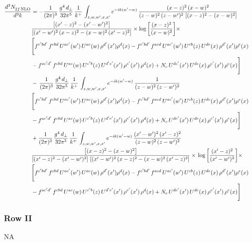 \documentclass[9pt]{article}
\numberwithin{equation}{section}
\begin{document}
\begin{align}
    \frac{d^{3}N_{2f\,\rm NLO}^{\rm}}{d^{3}k}  & =   - \frac{1}{(2\pi)^{3}}\, \frac{g^{4}\,d_{\perp}}{32\pi^{5}}\,\frac{1}{k^{+}}\,\int_{z,w,w^{\prime},x,x'} e^{-ik(w^{\prime}-w)}\,\frac{(x-z)^{2}\, (x-w)^{2}}{(z-w)^{2}\, (z-w')^{2}\,\left[(x-z)^{2} - (x-w)^{2}\right]}\notag \\ & \frac{\left[(x'-z)^{2}-(x'-w')^{2}\right]}{\left[(x'-w')^{2}\, (x-z)^{2} - (x-w)^{2}\, (x'-z)^{2}\right]}\times \log{\left[\frac{(x-z)^{2}}{(x-w)^{2}}\right]}\times\notag \\ & \Bigg[f^{c'bd'}\,f^{cbd}\, U^{ac'}(w')\,U^{ac}(w)\,\rho^{d'}(x')\rho^{d}(x)- f^{c'bd'}\,f^{acd}\,U^{ac'}(w')\,U^{cb}(z)\,U^{de}(x)\,\rho^{d'}(x')\rho^{e}(x) \notag \\ & -f^{ac'd'}\,f^{cbd}\,U^{ac}(w)\,U^{c'b}(z)\,U^{d'e'}(x')\,\rho^{e'}(x')\,\rho^{d}(x) +N_{c}\,U^{de'}(x')\,U^{de}(x)\,\rho^{e'}(x')\,\rho^{e}(x)\Bigg]  \notag \\
& -\, \frac{1}{(2\pi)^{3}}\, \frac{g^{4}\,d_{\perp}}{32\pi^{5}}\,\frac{1}{k^{+}}\,\int_{z,w,w^{\prime},x,x'} e^{-ik(w^{\prime}-w)}\,\frac{1}{(z-w)^{2}\, (z-w')^{2}}\notag \\ & \Bigg[f^{c'bd'}\,f^{cbd}\, U^{ac'}(w')\,U^{ac}(w)\,\rho^{d'}(x')\rho^{d}(x)- f^{c'bd'}\,f^{acd}\,U^{ac'}(w')\,U^{cb}(z)\,U^{de}(x)\,\rho^{d'}(x')\rho^{e}(x) \notag \\ & -f^{ac'd'}\,f^{cbd}\,U^{ac}(w)\,U^{c'b}(z)\,U^{d'e'}(x')\,\rho^{e'}(x')\,\rho^{d}(x) +N_{c}\,U^{de'}(x')\,U^{de}(x)\,\rho^{e'}(x')\,\rho^{e}(x)\Bigg]  \notag \\
& + \frac{1}{(2\pi)^{3}}\, \frac{g^{4}\,d_{\perp}}{32\pi^{5}}\,\frac{1}{k^{+}}\,\int_{z,w,w^{\prime},x,x'} e^{-ik(w^{\prime}-w)}\,\frac{(x'-w')^{2}\, (x'-z)^{2}}{(z-w)^{2}\, (z-w')^{2}}\notag \\ & \frac{\left[(x-z)^{2} - (x-w)^{2}\right]}{\left[(x'-z)^{2} - (x'-w')^{2}\right]\, \left[(x'-w')^{2}\, (x - z)^{2} - (x-w)^{2}\,(x'-z)^{2}\right]}\times\, \log{\left[\frac{(x'-z)^{2}}{(x'-w')^{2}}\right]}\times \notag \\ &  \Bigg[f^{c'bd'}\,f^{cbd}\, U^{ac'}(w')\,U^{ac}(w)\,\rho^{d'}(x')\rho^{d}(x)- f^{c'bd'}\,f^{acd}\,U^{ac'}(w')\,U^{cb}(z)\,U^{de}(x)\,\rho^{d'}(x')\rho^{e}(x) \notag \\ & -f^{ac'd'}\,f^{cbd}\,U^{ac}(w)\,U^{c'b}(z)\,U^{d'e'}(x')\,\rho^{e'}(x')\,\rho^{d}(x) +N_{c}\,U^{de'}(x')\,U^{de}(x)\,\rho^{e'}(x')\,\rho^{e}(x)\Bigg]
\end{align}
\subsubsection{Row II}
\textsc{NA}
\end{document}
